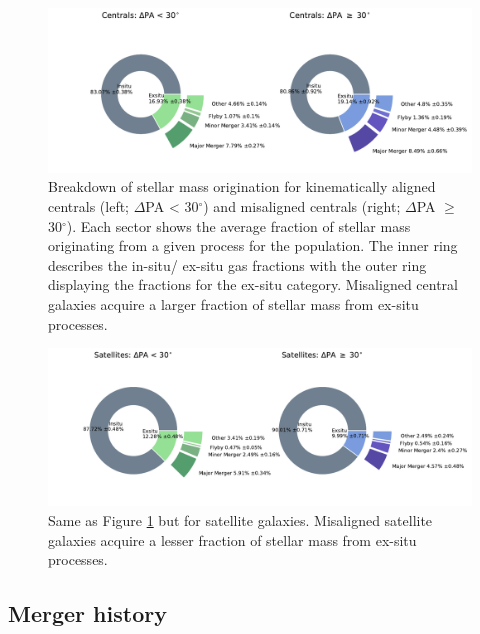 \documentclass[fleqn,usenatbib]{mnras}
\begin{document}
\begin{figure}
	\includegraphics[width=\linewidth]{tng_results/gas_donut_centrals_PA_split.pdf}
    \caption{Breakdown of stellar mass origination for kinematically aligned centrals (left; $\Delta$PA < 30$^{\circ}$) and misaligned centrals (right; $\Delta$PA $\geq$ 30$^{\circ}$). Each sector shows the average fraction of stellar mass originating from a given process for the population. The inner ring describes the in-situ/ ex-situ gas fractions with the outer ring displaying the fractions for the ex-situ category. Misaligned central galaxies acquire a larger fraction of stellar mass from ex-situ processes.}
    \label{fig:cen_gas_donut}
\end{figure}

\begin{figure}
	\includegraphics[width=\linewidth]{tng_results/gas_donut_satellites_PA_split.pdf}
    \caption{Same as Figure \ref{fig:cen_gas_donut} but for satellite galaxies. Misaligned satellite galaxies acquire a lesser fraction of stellar mass from ex-situ processes.}
    \label{fig:sat_gas_donut}
\end{figure}

\subsection{Merger history}
\end{document}
